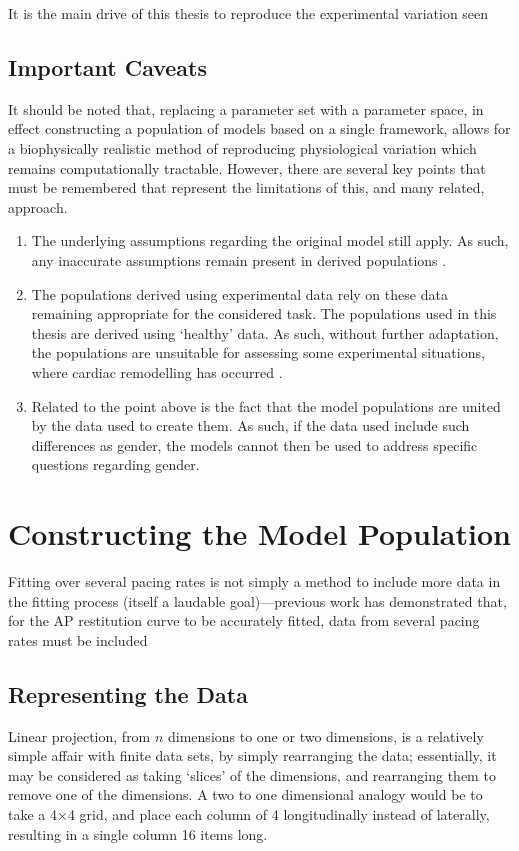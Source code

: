 \documentclass[../thesis-main.tex]{subfiles}
\begin{document}
 It is the main drive of this thesis to reproduce the experimental variation seen 
 
 \subsection{Important Caveats}
 \label{subsec:caveats}
 It should be noted that, replacing a parameter set with a parameter space, in effect constructing a population of models based on a single framework, allows for a biophysically realistic method of reproducing physiological variation which remains computationally tractable. However, there are several key points that must be remembered that represent the limitations of this, and many related, approach.
 \begin{enumerate}
  \item The underlying assumptions regarding the original model still apply. As such, any inaccurate assumptions remain present in derived populations \citet{Noble2001, Quinn2013}.
  \item The populations derived using experimental data rely on these data remaining appropriate for the considered task. The populations used in this thesis are derived using `healthy' data. As such, without further adaptation, the populations are unsuitable for assessing some experimental situations, \eg{} where cardiac remodelling has occurred \citep{Walmsley2013}.
  \item Related to the point above is the fact that the model populations are united by the data used to create them. As such, if the data used include such differences as gender, the models cannot then be used to address specific questions regarding gender.
 \end{enumerate}
 
 
 \section{Constructing the Model Population}
 \label{sec:methods}
 Fitting over several pacing rates is not simply a method to include more data in the fitting process (itself a laudable goal)---previous work has demonstrated that, for the AP restitution curve to be accurately fitted, data from several pacing rates must be included \citep{Syed2005}
 
 \subsection{Representing the Data}
 \label{subsec:cbdr}
 Linear projection, from $n$ dimensions to one or two dimensions, is a relatively simple affair with finite data sets, by simply rearranging the data; essentially, it may be considered as taking `slices' of the dimensions, and rearranging them to remove one of the dimensions. A two to one dimensional analogy would be to take a 4$\times$4 grid, and place each column of 4 longitudinally instead of laterally, resulting in a single column 16 items long.
 
\end{document}
